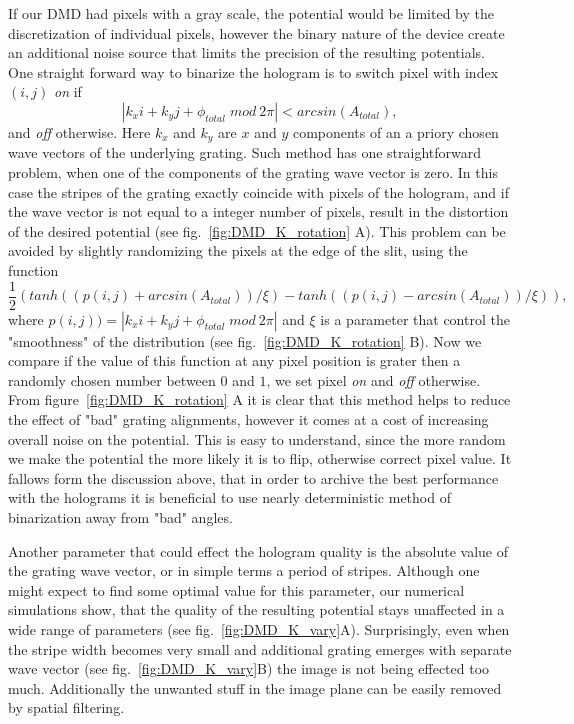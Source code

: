 If our DMD had pixels with a gray scale, the potential would be limited by the discretization of individual pixels, however the binary nature of the device create an additional noise source that limits the precision of the resulting potentials. One straight forward way to binarize the hologram is to switch pixel with index $(i,j)$ \textit{on} if 
\begin{equation}
\left| k_x i + k_y j + \phi_{total} \; mod \: 2 \pi \right| < arcsin(A_{total}),
\end{equation}
and \textit{off} otherwise. Here $k_x$ and $k_y$ are $x$ and $y$ components of an a priory chosen wave vectors of the underlying grating. Such method has one straightforward problem, when one of the components of the grating wave vector is zero. In this case the stripes of the grating exactly coincide with pixels of the hologram, and if the wave vector is not equal to a integer number of pixels, result in the distortion of the desired potential (see fig.~\ref{fig:DMD_K_rotation} A). This problem can be avoided by slightly randomizing the pixels at the edge of the slit, using the function 
\begin{equation}
\frac{1}{2}(tanh((p(i,j) + arcsin(A_{total}))/\xi) - tanh((p(i,j) - arcsin(A_{total}))/\xi)),
\end{equation}
where $p(i,j))=\left| k_x i + k_y j + \phi_{total} \; mod \: 2 \pi \right|$ and $\xi$ is a parameter that control the "smoothness" of the distribution (see fig.~\ref{fig:DMD_K_rotation} B). Now we compare if the value of this function at any pixel position is grater then a randomly chosen number between $0$ and $1$, we set pixel \textit{on} and \textit{off} otherwise. From figure~\ref{fig:DMD_K_rotation} A it is clear that this method helps to reduce the effect of "bad" grating alignments, however it comes at a cost of increasing overall noise on the potential. This is easy to understand, since the more random we make the potential the more likely it is to flip, otherwise correct pixel value. It fallows form the discussion above, that in order to archive the best performance with the holograms it is beneficial to use nearly deterministic method of binarization away from "bad" angles. 
 
Another parameter that could effect the hologram quality is the absolute value of the grating wave vector, or in simple terms a period of stripes. Although one might expect to find some optimal value for this parameter, our numerical simulations show, that the quality of the resulting potential stays unaffected in a wide range of parameters (see fig.~\ref{fig:DMD_K_vary}A). Surprisingly, even when the stripe width becomes very small and additional grating emerges with separate wave vector (see fig.~\ref{fig:DMD_K_vary}B) the image is not being effected too much. Additionally the unwanted stuff in the image plane can be easily removed by spatial filtering.
 
